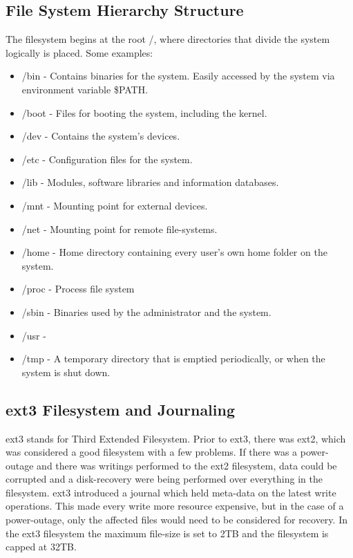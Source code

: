 \documentclass[12pt]{article}
\begin{document}
\subsection{File System Hierarchy Structure}
  The filesystem begins at the root /, where directories that divide the system logically is placed. Some examples:
  \begin{itemize}
    \item /bin - Contains binaries for the system. Easily accessed by the system via environment variable \$PATH.
    \item /boot - Files for booting the system, including the kernel.
    \item /dev - Contains the system's devices.
    \item /etc - Configuration files for the system.
    \item /lib - Modules, software libraries and information databases.
    \item /mnt - Mounting point for external devices.
    \item /net - Mounting point for remote file-systems.
    \item /home - Home directory containing every user's own home folder on the system. 
    \item /proc - Process file system
    \item /sbin - Binaries used by the administrator and the system.
    \item /usr -
    \item /tmp - A temporary directory that is emptied periodically, or when the system is shut down.
  \end{itemize}

\subsection{ext3 Filesystem and Journaling}
ext3 stands for Third Extended Filesystem. Prior to ext3, there was ext2, which was considered a good filesystem with a few problems.
If there was a power-outage and there was writings performed to the ext2 filesystem,
 data could be corrupted and a disk-recovery were being performed over everything in the filesystem.
ext3 introduced a journal which held meta-data on the latest write operations. This made every write more resource expensive,
 but in the case of a power-outage, only the affected files would need to be considered for recovery.
In the ext3 filesystem the maximum file-size is set to 2TB and the filesystem is capped at 32TB.
\end{document}
